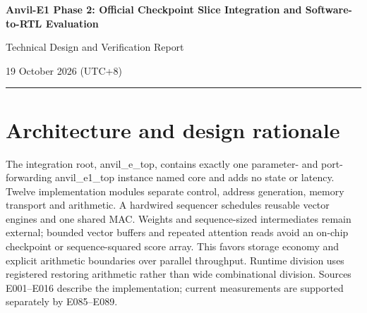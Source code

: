 \documentclass[11pt,a4paper]{article}
\begin{document}
{\sffamily\huge\raggedright\textbf{Anvil-E1 Phase 2: Official Checkpoint Slice Integration and Software-to-RTL Evaluation}\par}

{\large Technical Design and Verification Report}\par

19 October 2026 (\allowbreak{}UTC+\allowbreak{}8)\allowbreak{}\par\textcolor{vulcan}{\rule{\textwidth}{0.5pt}}

\begin{abstract}

Anvil-E1 is a parameterized,\allowbreak{} text-only SystemVerilog embedding engine with external weight and intermediate storage. Phase 2 integrates authentic BF16 coefficients from the supplied Google EmbeddingGemma-2 checkpoint slice,\allowbreak{} executes the adopted transformer equations in hardware,\allowbreak{} and compares public RTL outputs with independent integer and floating-point software references.


All sixteen official-weight jobs passed with zero Q8.24 word mismatches. Against raw-BF16-weight FP32 software inference,\allowbreak{} minimum cosine similarity was 0.9999999998517652 and maximum absolute error was 0.000012040138244628906. These measurements cover a deterministic reduced geometry with repeated source-layer mapping,\allowbreak{} not complete-checkpoint inference or application-level embedding quality.


\end{abstract}

\section{Architecture and design rationale}

The integration root,\allowbreak{} anvil\_\allowbreak{}e\_\allowbreak{}top,\allowbreak{} contains exactly one parameter- and port-forwarding anvil\_\allowbreak{}e1\_\allowbreak{}top instance named core and adds no state or latency. Twelve implementation modules separate control,\allowbreak{} address generation,\allowbreak{} memory transport and arithmetic. A hardwired sequencer schedules reusable vector engines and one shared MAC. Weights and sequence-sized intermediates remain external; bounded vector buffers and repeated attention reads avoid an on-chip checkpoint or sequence-squared score array. This favors storage economy and explicit arithmetic boundaries over parallel throughput. Runtime division uses registered restoring arithmetic rather than wide combinational division. Sources E001–E016 describe the implementation; current measurements are supported separately by E085–E089.
\end{document}
